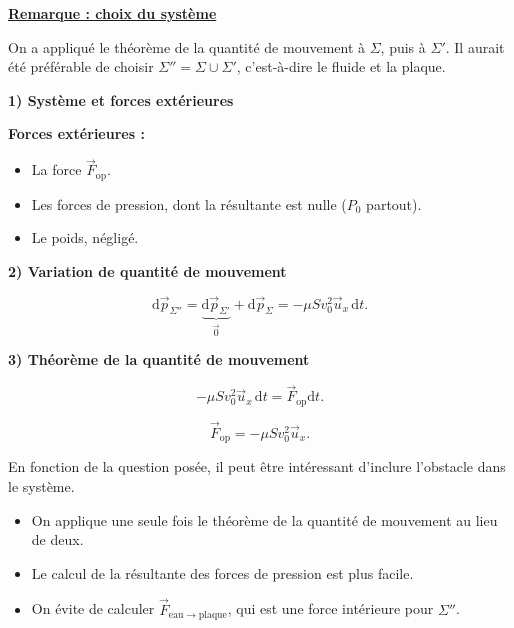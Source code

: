 \documentclass[11pt,a4paper]{article}
\newcommand{\dd}{\mathrm d}
\newcommand{\ux}{\vec u_x}\newcommand{\uy}{\vec u_y}\newcommand{\uz}{\vec u_z}
\newcommand{\titr}[1]{\par\textbf{\underline{#1}}\par\nopagebreak[3]}
\newcommand{\etape}[1]{\par\medskip\textbf{#1}\par\nopagebreak[4]}
\newcommand{\jetbase}{\draw[blue!65!black,thick](0,.35)..controls(2,.35)and(3.5,.4)..(3.7,1.3)--(3.7,2);\draw[blue!65!black,thick](0,-.35)..controls(2,-.35)and(3.5,-.4)..(3.7,-1.3)--(3.7,-2);\draw[blue!65!black,thick](4,-2)--(4,2);}
\begin{document}
\begin{exemple}[breakable]
\titr{Remarque : choix du système}
On a appliqué le théorème de la quantité de mouvement à $\Sigma$, puis à $\Sigma'$. Il aurait été préférable de choisir $\Sigma''=\Sigma\cup\Sigma'$, c'est-à-dire le fluide et la plaque.
\par\noindent\begin{minipage}{\linewidth}
\etape{1) Système et forces extérieures}
\begin{center}\end{center}
\end{minipage}\par
\par\par\par\medskip\noindent\begin{minipage}{\linewidth}
\textbf{Forces extérieures :}
\begin{itemize}
\item La force $\vec F_{\mathrm{op}}$.
\item Les forces de pression, dont la résultante est nulle ($P_0$ partout).
\item Le poids, négligé.
\end{itemize}
\end{minipage}\par
\etape{2) Variation de quantité de mouvement}
\[\dd\vec p_{\Sigma''}=\underbrace{\dd\vec p_{\Sigma'}}_{\vec0}+\dd\vec p_\Sigma=-\mu Sv_0^2\ux\,\dd t.\]
\etape{3) Théorème de la quantité de mouvement}
\[-\mu Sv_0^2\ux\,\dd t=\vec F_{\mathrm{op}}\dd t.\]
\begin{cadre}\[\vec F_{\mathrm{op}}=-\mu Sv_0^2\ux.\]\end{cadre}
\begin{cadre}
En fonction de la question posée, il peut être intéressant d'inclure l'obstacle dans le système.
\begin{itemize}\item On applique une seule fois le théorème de la quantité de mouvement au lieu de deux.
\item Le calcul de la résultante des forces de pression est plus facile.
\item On évite de calculer $\vec F_{\mathrm{eau}\to\mathrm{plaque}}$, qui est une force intérieure pour $\Sigma''$.\end{itemize}
\end{cadre}
\end{exemple}
\end{document}
